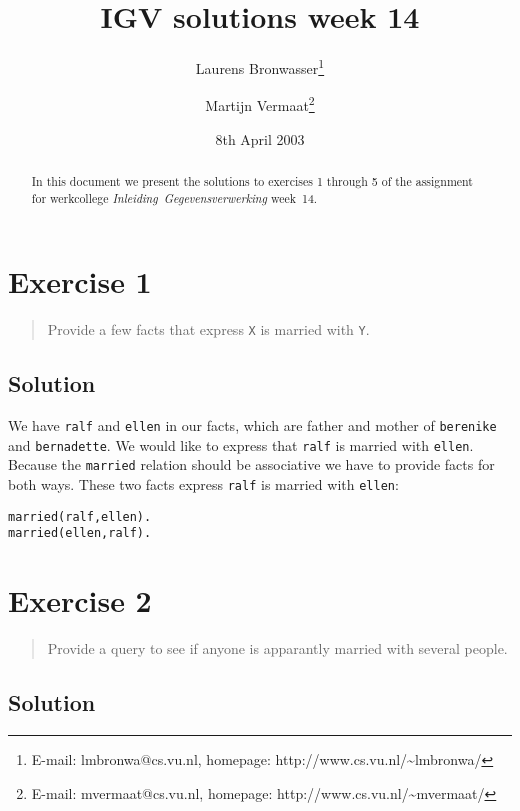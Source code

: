 \documentclass[11pt]{article}
\title{IGV solutions week 14}
\author{
	Laurens Bronwasser\footnote{E-mail: lmbronwa@cs.vu.nl, homepage: http://www.cs.vu.nl/\~{}lmbronwa/}
	\and
	Martijn Vermaat\footnote{E-mail: mvermaat@cs.vu.nl, homepage: http://www.cs.vu.nl/\~{}mvermaat/}
}
\date{8th April 2003}
\begin{document}
\maketitle

\begin{abstract}
In this document we present the solutions to exercises 1 through 5 of the assignment for werkcollege \emph{\mbox{Inleiding Gegevensverwerking}} \mbox{week 14}.
\end{abstract}

\tableofcontents


\newpage

\section{Exercise 1}

\begin{quote}
Provide a few facts that express \verb|X| is married with \verb|Y|.
\end{quote}

\subsection*{Solution}

We have \verb|ralf| and \verb|ellen| in our facts, which are father and mother of \verb|berenike| and \verb|bernadette|. We would like to express that \verb|ralf| is married with \verb|ellen|. Because the \verb|married| relation should be associative we have to provide facts for both ways. These two facts express \verb|ralf| is married with \verb|ellen|:

\begin{verbatim}
married(ralf,ellen).
married(ellen,ralf).
\end{verbatim}


\newpage

\section{Exercise 2}

\begin{quote}
Provide a query to see if anyone is apparantly married with several people.
\end{quote}

\subsection*{Solution}
\end{document}
